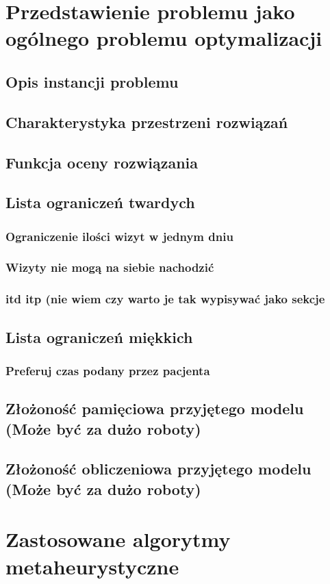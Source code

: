 \chapter{Przedstawienie problemu jako ogólnego problemu optymalizacji}
\section{Opis instancji problemu}
\section{Charakterystyka przestrzeni rozwiązań}
\section{Funkcja oceny rozwiązania}
\section{Lista ograniczeń twardych}
\subsection{Ograniczenie ilości wizyt w jednym dniu}
\subsection{Wizyty nie mogą na siebie nachodzić}
\subsection{itd itp (nie wiem czy warto je tak wypisywać jako sekcje}
\section{Lista ograniczeń miękkich}
\subsection{Preferuj czas podany przez pacjenta}
\section{Złożoność pamięciowa przyjętego modelu (Może być za dużo roboty)}
\section{Złożoność obliczeniowa przyjętego modelu (Może być za dużo roboty)}

\chapter{Zastosowane algorytmy metaheurystyczne}
